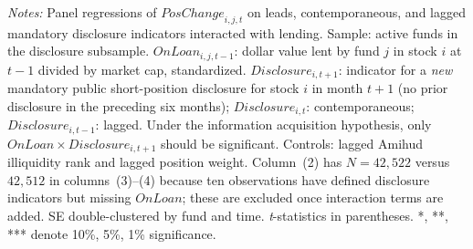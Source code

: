 {\footnotesize
\textit{Notes:} Panel regressions of $\mathit{PosChange}_{i,j,t}$ on leads, contemporaneous, and lagged mandatory disclosure indicators interacted with lending. Sample: active funds in the disclosure subsample. $\mathit{OnLoan}_{i,j,t-1}$: dollar value lent by fund $j$ in stock $i$ at $t-1$ divided by market cap, standardized. $\mathit{Disclosure}_{i,t+1}$: indicator for a \textit{new} mandatory public short-position disclosure for stock $i$ in month $t+1$ (no prior disclosure in the preceding six months); $\mathit{Disclosure}_{i,t}$: contemporaneous; $\mathit{Disclosure}_{i,t-1}$: lagged. Under the information acquisition hypothesis, only $\mathit{OnLoan} \times \mathit{Disclosure}_{i,t+1}$ should be significant. Controls: lagged Amihud illiquidity rank and lagged position weight. Column~(2) has $N = 42{,}522$ versus $42{,}512$ in columns~(3)--(4) because ten observations have defined disclosure indicators but missing $\mathit{OnLoan}$; these are excluded once interaction terms are added. SE double-clustered by fund and time. \textit{t}-statistics in parentheses. *, **, *** denote 10\%, 5\%, 1\% significance.
}
